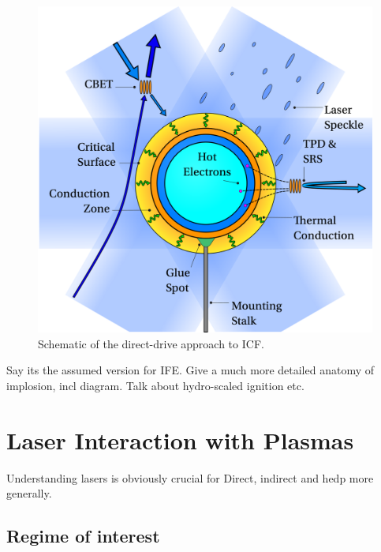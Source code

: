 \begin{figure}[t!]
    \includegraphics[width=0.7\linewidth]{Introduction/Images/direct icf white.png}
    \centering
    \caption{Schematic of the direct-drive approach to \ac{ICF}.
    }%
    \label{fig:intro_direct}
\end{figure}

Say its the assumed version for IFE.
Give a much more detailed anatomy of implosion, incl diagram.
Talk about hydro-scaled ignition etc.

\section{Laser Interaction with Plasmas}%
\label{sec:intro_laserplasmas}

Understanding lasers is obviously crucial for Direct, indirect and hedp more generally.

\subsection{Regime of interest}%
\label{sec:intro_laser_regime}

